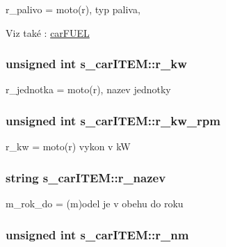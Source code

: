 r\-\_\-palivo = moto(r), typ paliva, 

\begin{DoxySeeAlso}{\-Viz také}
\-: \hyperlink{io_8h_a5a939c07993e0071f24abc5eeb3e32c1}{car\-F\-U\-E\-L} 
\end{DoxySeeAlso}
\hypertarget{structs__carITEM_adebdcb0629c4d2738f06b462caf10576}{
\subsubsection[{r\-\_\-kw}]{\setlength{\rightskip}{0pt plus 5cm}unsigned int {\bf s\-\_\-car\-I\-T\-E\-M\-::r\-\_\-kw}}}
\label{d7/da8/structs__carITEM_adebdcb0629c4d2738f06b462caf10576}


r\-\_\-jednotka = moto(r), nazev jednotky 

\hypertarget{structs__carITEM_ad2a7d41a5464f90aa3faac5216bdaa03}{
\subsubsection[{r\-\_\-kw\-\_\-rpm}]{\setlength{\rightskip}{0pt plus 5cm}unsigned int {\bf s\-\_\-car\-I\-T\-E\-M\-::r\-\_\-kw\-\_\-rpm}}}
\label{d7/da8/structs__carITEM_ad2a7d41a5464f90aa3faac5216bdaa03}


r\-\_\-kw = moto(r) vykon v k\-W 

\hypertarget{structs__carITEM_a114f1162d2b3165c3ce07fa6d128d96b}{
\subsubsection[{r\-\_\-nazev}]{\setlength{\rightskip}{0pt plus 5cm}string {\bf s\-\_\-car\-I\-T\-E\-M\-::r\-\_\-nazev}}}
\label{d7/da8/structs__carITEM_a114f1162d2b3165c3ce07fa6d128d96b}


m\-\_\-rok\-\_\-do = (m)odel je v obehu do roku 

\hypertarget{structs__carITEM_acded6b0c9bcf2c711eb7f127d1fba382}{
\subsubsection[{r\-\_\-nm}]{\setlength{\rightskip}{0pt plus 5cm}unsigned int {\bf s\-\_\-car\-I\-T\-E\-M\-::r\-\_\-nm}}}
\label{d7/da8/structs__carITEM_acded6b0c9bcf2c711eb7f127d1fba382}


